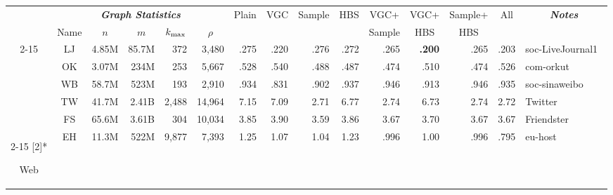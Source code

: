 \begin{table*}[htbp] 
      \centering
      \small
      \vspace{-1em}

    \begin{tabular}{ccrrrr|rrrrrrrr|l}
          & \multicolumn{5}{c|}{\textit{\textbf{Graph Statistics}}} & \multicolumn{1}{c}{\multirow{2}[1]{*}{Plain}} & \multicolumn{1}{c}{\multirow{2}[1]{*}{VGC}} & \multicolumn{1}{c}{\multirow{2}[1]{*}{Sample}} & \multicolumn{1}{c}{\multirow{2}[1]{*}{HBS}} & \multicolumn{1}{c}{VGC+} & \multicolumn{1}{c}{VGC+} & \multicolumn{1}{c}{Sample+} & \multicolumn{1}{c|}{\multirow{2}[1]{*}{All}} & \multicolumn{1}{c}{\multirow{2}[1]{*}{\textit{\textbf{Notes}}}} \\
          & Name  & \multicolumn{1}{c}{$n$} & \multicolumn{1}{c}{$m$} & \multicolumn{1}{c}{${k_{\max}}$} & \multicolumn{1}{c|}{$\rho$} &       &       &       &       & \multicolumn{1}{c}{Sample} & \multicolumn{1}{c}{HBS} & \multicolumn{1}{c}{HBS} &       &  \\
\cmidrule{2-15}    \multicolumn{1}{c}{\multirow{5}[2]{*}{\begin{sideways}Social\end{sideways}}} & LJ    & 4.85M & 85.7M & 372   & 3,480 & .275  & .220  & .276  & .272  & .265  & \textbf{.200} & .265  & .203  & soc-LiveJournal1~\cite{backstrom2006group} \\
          & OK    & 3.07M & 234M  & 253   & 5,667 & .528  & .540  & .488  & .487  & .474  & .510  & .474  & .526  & com-orkut~\cite{yang2015defining} \\
          & WB    & 58.7M & 523M  & 193   & 2,910 & .934  & .831  & .902  & .937  & .946  & .913  & .946  & .935  & soc-sinaweibo~\cite{nr} \\
          & TW    & 41.7M & 2.41B & 2,488 & 14,964 & 7.15  & 7.09  & 2.71  & 6.77  & 2.74  & 6.73  & 2.74  & 2.72  & Twitter~\cite{kwak2010twitter} \\
          & FS    & 65.6M & 3.61B & 304   & 10,034 & 3.85  & 3.90  & 3.59  & 3.86  & 3.67  & 3.70  & 3.67  & 3.67  & Friendster~\cite{yang2015defining} \\
\cmidrule{2-15}    \multirow{5}[2]{*}{\begin{sideways}Web\end{sideways}} & EH    & 11.3M & 522M  & 9,877 & 7,393 & 1.25  & 1.07  & 1.04  & 1.23  & .996  & 1.00  & .996  & .795  & eu-host~\cite{webgraph} \\

\end{tabular}
\end{table*}

